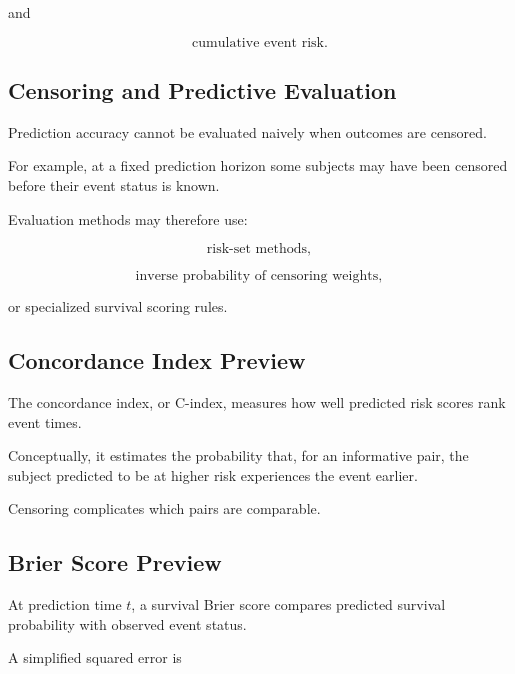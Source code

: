 and

\[
\boxed{
\text{cumulative event risk}.
}
\]

\subsection{Censoring and Predictive Evaluation}
\label{subsec:censoring-predictive-evaluation}

Prediction accuracy cannot be evaluated naively when outcomes are
censored.

For example, at a fixed prediction horizon some subjects may have been
censored before their event status is known.

Evaluation methods may therefore use:

\[
\boxed{
\text{risk-set methods},
}
\]

\[
\boxed{
\text{inverse probability of censoring weights},
}
\]

or specialized survival scoring rules.

\subsection{Concordance Index Preview}
\label{subsec:concordance-index-preview}

The concordance index, or C-index, measures how well predicted risk
scores rank event times.

Conceptually, it estimates the probability that, for an informative pair,
the subject predicted to be at higher risk experiences the event earlier.

Censoring complicates which pairs are comparable.

\subsection{Brier Score Preview}
\label{subsec:survival-brier-score}

At prediction time \(t\), a survival Brier score compares predicted
survival probability with observed event status.

A simplified squared error is

